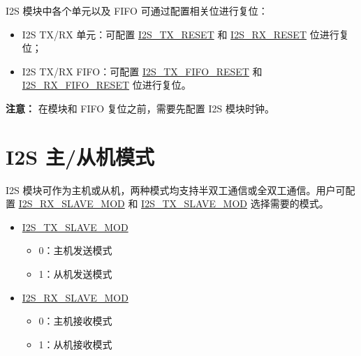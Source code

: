 \documentclass[main\_\_CN.tex]{subfiles}
\begin{document}
I2S 模块中各个单元以及 FIFO 可通过配置相关位进行复位：
\begin{itemize}
\item I2S TX/RX 单元：可配置 \hyperref[fielddesc:I2STXRESET]{I2S\_TX\_RESET} 和 \hyperref[fielddesc:I2SRXRESET]{I2S\_RX\_RESET} 位进行复位；
\item I2S TX/RX FIFO：可配置 \hyperref[fielddesc:I2STXFIFORESET]{I2S\_TX\_FIFO\_RESET} 和 \hyperref[fielddesc:I2SRXFIFORESET]{I2S\_RX\_FIFO\_RESET} 位进行复位。
\end{itemize}


{\bfseries 注意：}
在模块和 FIFO 复位之前，需要先配置 I2S 模块时钟。
 

\section{I2S 主/从机模式}

\chipname{} I2S 模块可作为主机或从机，两种模式均支持半双工通信或全双工通信。用户可配置  \hyperref[fielddesc:I2SRXSLAVEMOD]{I2S\_RX\_SLAVE\_MOD} 和 \hyperref[fielddesc:I2STXSLAVEMOD]{I2S\_TX\_SLAVE\_MOD} 选择需要的模式。

\begin{itemize}
    \item \hyperref[fielddesc:I2STXSLAVEMOD]{I2S\_TX\_SLAVE\_MOD} 
    \begin{itemize}
        \item 0：主机发送模式
        \item 1：从机发送模式
    \end{itemize}
    \item \hyperref[fielddesc:I2SRXSLAVEMOD]{I2S\_RX\_SLAVE\_MOD}
    \begin{itemize}
        \item 0：主机接收模式
        \item 1：从机接收模式
    \end{itemize}
\end{itemize}
\end{document}
